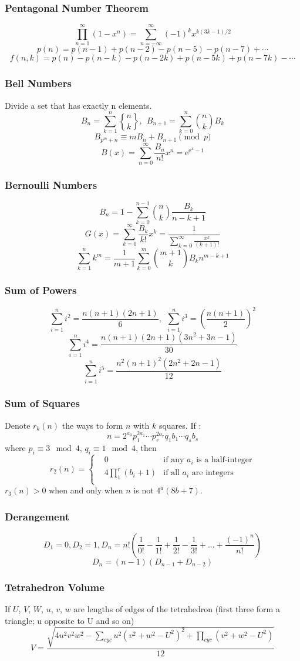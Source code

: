 \subsubsection{Pentagonal Number Theorem}
\[ \prod_{n=1}^{\infty}(1-x^n) = \sum_{n=-\infty}^{\infty}{(-1)^kx^{k(3k-1)/2}} \]
\[ p(n) = p(n-1)+p(n-2)-p(n-5)-p(n-7)+\cdots \]
\[ f(n, k) = p(n)-p(n-k)-p(n-2k)+p(n-5k)+p(n-7k)-\cdots \]
\subsubsection{Bell Numbers}
Divide a set that has exactly n elements.
\[ B_n=\sum_{k=1}^{n}{n\brace k},\ \ B_{n+1} = \sum_{k=0}^n{n \choose k}B_k \]
\[ B_{p^m+n} \equiv mB_n+B_{n+1} \pmod{p} \]
\[B(x)=\sum_{n=0}^{\infty}\frac{B_n}{n!}x^n=\mathrm{e}^{\mathrm{e}^x-1}\]
\subsubsection{Bernoulli Numbers}
\[ B_n = 1 - \sum_{k=0}^{n-1}{n \choose k}\frac{B_k}{n-k+1} \]
\[ G(x) = \sum_{k=0}^{\infty}\frac{B_k}{k!}x^k
= \frac{1}{\sum_{k=0}^{\infty}\frac{x^k}{(k+1)!}} \]
\[ \sum_{k=1}^nk^m = \frac{1}{m+1}\sum_{k=0}^m{m+1 \choose k}B_kn^{m-k+1} \]
\subsubsection{Sum of Powers}
\[\sum_{i=1}^ni^2=\frac{n(n+1)(2n+1)}{6},\ \ \sum_{i=1}^ni^3=(\frac{n(n+1)}{2})^2\]
\[\sum_{i=1}^ni^4=\frac{n(n+1)(2n+1)(3n^2+3n-1)}{30}\]
\[\sum_{i=1}^ni^5=\frac{n^2(n+1)^2(2n^2+2n-1)}{12}\]
\subsubsection{Sum of Squares}
Denote $r_k(n)$ the ways to form $n$ with $k$ squares. If :
\[n=2^{a_0}p_1^{2a_1}\cdots p_r^{2a_r}q_1{b_1}\cdots q_s{b_s}\]
where $p_i\equiv 3 \mod 4$, $q_i\equiv 1 \mod 4$, then
\[r_2(n)=\left\{\begin{aligned}
& 0 & \text{if any }a_i\text{ is a half-integer}\\
& 4\prod_1^r(b_i+1) & \text{if all }a_i\text{ are integers}\\
\end{aligned}\right.\]
$r_3(n)>0$ when and only when $n$ is not $4^a(8b+7)$.
\subsubsection{Derangement}
\[D_1=0,D_2=1,D_n=n!(\frac{1}{0!}-\frac{1}{1!}+\frac{1}{2!}-\frac{1}{3!}+...+\frac{(-1)^n}{n!})\]
\[D_n=(n-1)(D_{n-1}+D_{n-2})\]
\subsubsection{Tetrahedron Volume}
If $U$, $V$, $W$, $u$, $v$, $w$ are lengths of edges of the tetrahedron (first three form a triangle; u opposite to U and so on)
\[ V = \frac{\sqrt{ 4u^2v^2w^2 - \sum_{cyc}{u^2(v^2+w^2-U^2)^2} + \prod_{cyc}{(v^2+w^2-U^2)} }}{12} \]

